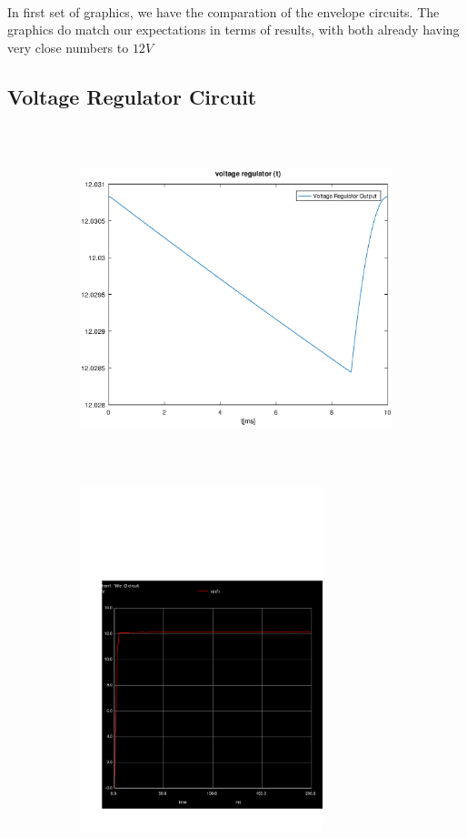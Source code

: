 \paragraph{}
In first set of graphics, we have the comparation of the envelope circuits. The graphics do match our expectations in terms of results, with both already having very close numbers to $12V$


\subsection{Voltage Regulator Circuit}
\label{subsec:second_topic_error}
\begin{figure}[H]

\begin{subfigure}{0.5\textwidth}
\includegraphics[width=0.9\linewidth, height=10cm]{output.eps} 
\label{fig:theosecondcompare}
\end{subfigure}
\begin{subfigure}{0.5\textwidth}
\includegraphics[width=0.9\linewidth, height=10cm]{trans2.pdf}
\label{fig:simsecondcompare}
\end{subfigure}

\label{fig:compar2}
\end{figure}


